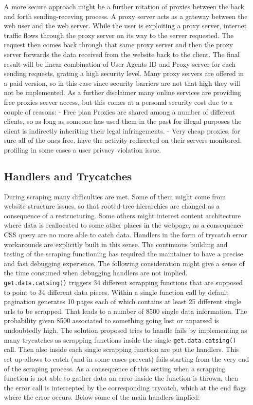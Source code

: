 \documentclass[
  12pt,
  a4paper,
  oneside]{book}
\theoremstyle{definition}
\theoremstyle{definition}
\theoremstyle{definition}
\theoremstyle{remark}
\begin{document}
A more secure approach might be a further rotation of proxies between the back and forth sending-receving process. A proxy server acts as a gateway between the web user and the web server.
While the user is exploiting a proxy server, internet traffic flows through the proxy server on its way to the server requested. The request then comes back through that same proxy server and then the proxy server forwards the data received from the website back to the client. The final result will be linear combination of User Agents ID and Proxy server for each sending requests, grating a high security level.
Many proxy servers are offered in a paid version, so in this case since security barriers are not that high they will not be implemented. As a further disclaimer many online services are providing free proxies server access, but this comes at a personal security cost due to a couple of reasons:
- Free plan Proxies are shared among a number of different clients, so as long as someone has used them in the past for illegal purposes the client is indirectly inheriting their legal infringements.
- Very cheap proxies, for sure all of the ones free, have the activity redirected on their servers monitored, profiling in some cases a user privacy violation issue.

\hypertarget{handlers-and-trycatches}{%
\subsection{Handlers and Trycatches}\label{handlers-and-trycatches}}

During scraping many difficulties are met. Some of them might come from website structure issues, so that rooted-tree hierarchies are changed as a consequence of a restructuring. Some others might interest content architecture where data is reallocated to some other places in the webpage, as a consequence CSS query are no more able to catch data. Handlers in the form of trycatch error workarounds are explicitly built in this sense. The continuous building and testing of the scraping functioning has required the maintainer to have a precise and fast debugging experience. The following consideration might give a sense of the time consumed when debugging handlers are not implied. \texttt{get.data.catsing()} triggers 34 different scrapping functions that are supposed to point to 34 different data pieces. Within a single function call by default pagination generates 10 pages each of which contains at least 25 different single urls to be scrapped. That leads to a number of 8500 single data information. The probability given 8500 associated to something going lost or unparsed is undoubtedly high.
The solution proposed tries to handle fails by implementing as many trycatches as scrapping functions inside the single \texttt{get.data.catsing()} call. Then also inside each single scrapping function are put the handlers. This set up allows to catch (and in some cases prevent) fails starting from the very end of the scraping process. As a consequence of this setting when a scrapping function is not able to gather data an error inside the function is thrown, then the error call is intercepted by the corresponding trycatch, which at the end flags where the error occurs.
Below some of the main handlers implied:
\end{document}
